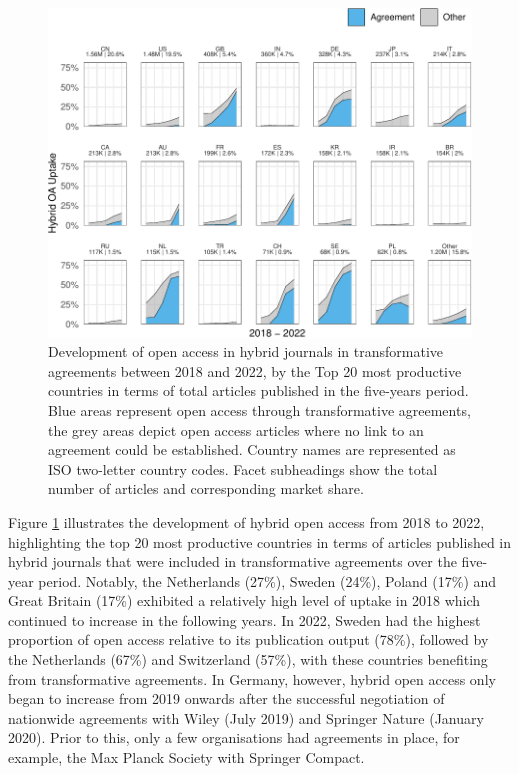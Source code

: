 \documentclass[a4paper,man,floatsintext,longtable,noextraspace,12pt]{apa6}
\begin{document}
\begin{figure}[ht!]

{\centering \includegraphics[width=0.99\linewidth,]{fig/country_top_20_plot-1} 

}

\caption{Development of open access in hybrid journals in transformative agreements between 2018 and 2022, by the Top 20 most productive countries in terms of total articles published in the five-years period. Blue areas represent open access through transformative agreements, the grey areas depict open access articles where no link to an agreement could be established. Country names are represented as ISO two-letter country codes. Facet subheadings show the total number of articles and corresponding market share.}\label{fig:country_top_20_plot}
\end{figure}

Figure \ref{fig:country_top_20_plot} illustrates the development of
hybrid open access from 2018 to 2022, highlighting the top 20 most
productive countries in terms of articles published in hybrid journals
that were included in transformative agreements over the five-year
period. Notably, the Netherlands (27\%), Sweden (24\%), Poland (17\%)
and Great Britain (17\%) exhibited a relatively high level of uptake in
2018 which continued to increase in the following years. In 2022, Sweden
had the highest proportion of open access relative to its publication
output (78\%), followed by the Netherlands (67\%) and Switzerland
(57\%), with these countries benefiting from transformative agreements.
In Germany, however, hybrid open access only began to increase from 2019
onwards after the successful negotiation of nationwide agreements with
Wiley (July 2019) and Springer Nature (January 2020). Prior to this,
only a few organisations had agreements in place, for example, the Max
Planck Society with Springer Compact.
\end{document}
